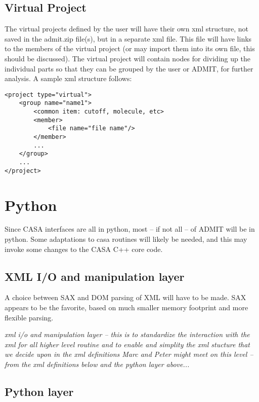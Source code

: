 \documentclass{report}
\begin{document}
\subsection{Virtual Project}

The virtual projects defined by the user will have their own xml
structure, not saved in the admit.zip file(s), but in a separate xml
file. This file will have links to the members of the virtual project
(or may import them into its own file, this should be discussed). The
virtual project will contain nodes for dividing up the individual
parts so that they can be grouped by the user or ADMIT, for further
analysis. A sample xml structure follows:


\begin{verbatim}
<project type="virtual">
    <group name="name1">
    	<common item: cutoff, molecule, etc>
    	<member>
    		<file name="file name"/>
    	</member>
    	...
    </group>
    ...
</project>
\end{verbatim}


\section{Python}

Since CASA interfaces are all in python, most -- if not all -- of
ADMIT will be in python. Some adaptations to casa routines will
likely be needed, and this may invoke some changes to the CASA
C++ core code.

\subsection{XML I/O and manipulation layer}

A choice between SAX and DOM parsing of XML will have to be made.
SAX appears to be the favorite, based on much smaller memory
footprint and more flexible parsing.




{\it xml i/o and manipulation layer -- this is to standardize
the interaction with the xml for all higher level
routine and to enable and simplity the xml stucture
that we decide upon in the xml definitions
Marc and Peter might meet on this level -- from the
xml definitions below and the python layer above...}



\subsection{Python layer}
\end{document}
